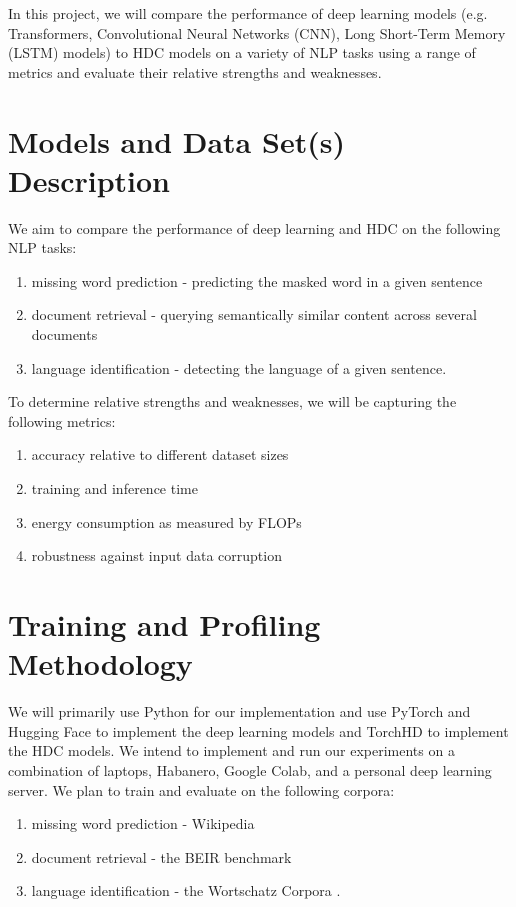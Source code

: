 \documentclass[conference]{IEEEtran}
\begin{document}
In this project, we will compare the performance of deep learning models (e.g. Transformers, Convolutional Neural Networks (CNN), Long Short-Term Memory (LSTM) models) to HDC models on a variety of NLP tasks using a range of metrics and evaluate their relative strengths and weaknesses.

\section{Models and Data Set(s) Description}
We aim to compare the performance of deep learning and HDC on the following NLP tasks: 
\begin{enumerate}
    \item missing word prediction - predicting the masked word in a given sentence
    \item document retrieval - querying semantically similar content across several documents
    \item language identification - detecting the language of a given sentence.
\end{enumerate}

To determine relative strengths and weaknesses, we will be capturing the following metrics:
\begin{enumerate}
    \item accuracy relative to different dataset sizes
    \item training and inference time
    \item energy consumption as measured by FLOPs \cite{desislavov2021compute}
    \item robustness against input data corruption
\end{enumerate}

\section{Training and Profiling Methodology}
We will primarily use Python for our implementation and use PyTorch and Hugging Face \cite{HF} to implement the deep learning models and TorchHD \cite{torchhd} to implement the HDC models. We intend to implement and run our experiments on a combination of laptops, Habanero, Google Colab, and a personal deep learning server. We plan to train and evaluate on the following corpora:
\begin{enumerate}
    \item missing word prediction - Wikipedia \cite{wikipedia}
    \item document retrieval - the BEIR benchmark \cite{BEIR}
    \item language identification - the Wortschatz Corpora \cite{quasthoff-etal-2006-corpus}.
\end{enumerate}
\end{document}
